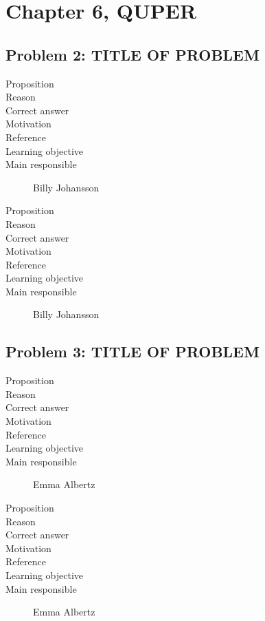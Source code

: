 \documentclass[10pt,a4paper]{article}
\begin{document}
\section*{Chapter 6, QUPER}
\subsection*{Problem 2: TITLE OF PROBLEM}
\begin{description}
\item[Proposition] 
\item[Reason] 
\item[Correct answer]
\item[Motivation]
\item[Reference]
\item[Learning objective]
\item[Main responsible] Billy Johansson
\end{description}

\begin{description}
\item[Proposition] 
\item[Reason] 
\item[Correct answer]
\item[Motivation]
\item[Reference]
\item[Learning objective]
\item[Main responsible] Billy Johansson
\end{description}

\subsection*{Problem 3: TITLE OF PROBLEM}
\begin{description}
\item[Proposition] 
\item[Reason] 
\item[Correct answer]
\item[Motivation]
\item[Reference]
\item[Learning objective]
\item[Main responsible] Emma Albertz
\end{description}

\begin{description}
\item[Proposition] 
\item[Reason] 
\item[Correct answer]
\item[Motivation]
\item[Reference]
\item[Learning objective]
\item[Main responsible] Emma Albertz
\end{description}
\end{document}
